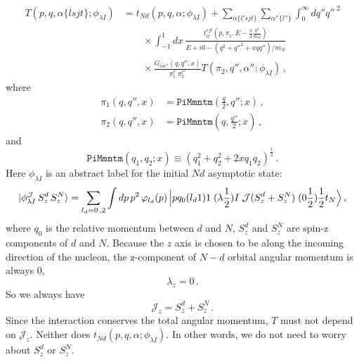 \documentclass[11pt,aps]{revtex4}
\begin{document}
\begin{equation}
  \begin{split}
    T(p, q, \alpha \{l s j t\}; \phi_{\lambda I}) &= t_{Nd}(p, q, \alpha; \phi_{\lambda I}) + \sum_{\bar{\alpha} \{l' s j t \} }\sum_{\alpha'' \{l''\}} \int_0^\infty dq'' {q''\,}^2 \\
    & \qquad \times \int_{-1}^1{dx} \, \frac{t_{ll'}^{sjt} (p, \pi_1, E - \frac{3}{4} \frac{q^2}{m_N})}{E + i0 - (q^2 + {q''}^2 + x qq'')/m_N} \\
    & \qquad \times \frac{G_{\bar{\alpha}\alpha''}(q, q'', x)}{\pi_1^{l'} \, \pi_2^{l''}} T(\pi_2, q'', \alpha''; \phi_{\lambda I}) \, , \label{eqn-inhomo-prime}
  \end{split}
\end{equation}
where
\begin{equation*}
  \begin{split}
    \pi_1(q, q'', x) &= \texttt{PiMmntm}\left(\frac{q}{2}, q''; x\right) \, , \\
    \pi_2(q, q'', x) &= \texttt{PiMmntm}\left(q, \frac{q''}{2}; x\right) \, ,
  \end{split}
\end{equation*}
and
\begin{equation*}
  \texttt{PiMmntm}(q_1, q_2; x) \equiv  \left(q_1^2 + q_2^2 + 2xq_1q_2\right)^\frac{1}{2}\, .
\end{equation*}
Here $\phi_{\lambda I}$ is an abstract label for the initial $N d$ asymptotic state:
\begin{equation}
 |\phi^\mathcal{J}_{\lambda I}\, S_z^d\, S_z^N \rangle = \sum_{l_d = 0\, , 2} \int dp\, p^2\, \varphi_{l_d} (p)\, \Big{|} p q_0 (l_d 1)1\; (\lambda \frac{1}{2})I\; \mathcal{J} (S_z^d+S_z^N)\; (0\frac{1}{2})\frac{1}{2} t_N \Big{\rangle} \, ,
\end{equation}
where $q_0$ is the relative momentum between $d$ and $N$, $S_z^d$ and $S_z^N$ are spin-z components of $d$ and $N$. Because the $z$ axis is chosen to be along the incoming direction of the nucleon, the z-component of $N-d$ orbital angular momentum is always $0$,
\begin{equation*}
  \lambda_z = 0 \, .
\end{equation*}
So we always have
\begin{equation*}
  \mathcal{J}_z = S_z^d + S_z^N \, .
\end{equation*}
Since the interaction conserves the total angular momentum, $T$ must not depend on $\mathcal{J}_z$. Neither does $t_{Nd}(p, q, \alpha; \phi_{\lambda I})$. In other words, we do not need to worry about $S_z^d$ or $S_z^N$.
\end{document}
